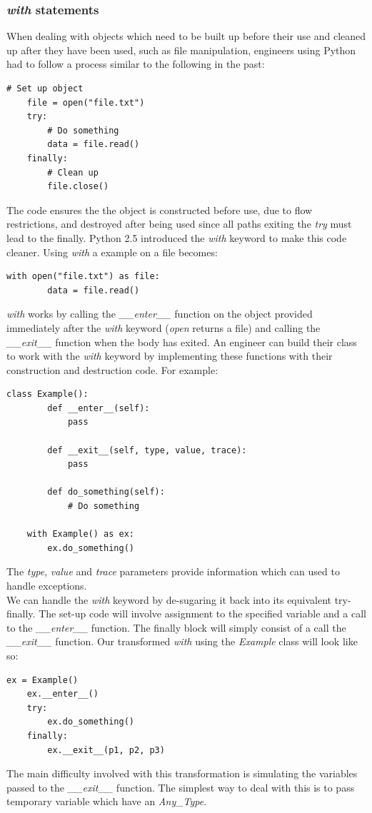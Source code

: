 \documentclass[12pt, titlepage]{article}
\begin{document}
\subsubsection{\textit{with} statements}
When dealing with objects which need to be built up before their use and cleaned up after they have been used, such as file manipulation, engineers using Python had to follow a process similar to the following in the past:
\begin{lstlisting}[mathescape]
	# Set up object
	file = open("file.txt")
	try:
		# Do something
		data = file.read()
	finally:
		# Clean up
		file.close()
\end{lstlisting}
The code ensures the the object is constructed before use, due to flow restrictions, and destroyed after being used since all paths exiting the \textit{try} must lead to the finally. Python 2.5 introduced the \textit{with} keyword to make this code cleaner. Using \textit{with} a example on a file becomes:
\begin{lstlisting}[mathescape]
	with open("file.txt") as file:
		data = file.read()
\end{lstlisting}
\textit{with} works by calling the \textit{\_\_enter\_\_} function on the object provided immediately after the \textit{with} keyword (\textit{open} returns a file) and calling the \textit{\_\_exit\_\_} function when the body has exited. An engineer can build their class to work with the \textit{with} keyword by implementing these functions with their construction and destruction code. For example:
\begin{lstlisting}[mathescape]
	class Example():
		def __enter__(self):
			pass
			
		def __exit__(self, type, value, trace):
			pass
			
		def do_something(self):
			# Do something
			
	with Example() as ex:
		ex.do_something()
\end{lstlisting}
The \textit{type}, \textit{value} and \textit{trace} parameters provide information which can used to handle exceptions. \\
We can handle the \textit{with} keyword by de-sugaring it back into its equivalent try-finally. The set-up code will involve assignment to the specified variable and a call to the \textit{\_\_enter\_\_} function. The finally block will simply consist of a call the \textit{\_\_exit\_\_} function. Our transformed \textit{with} using the \textit{Example} class will look like so:
\begin{lstlisting}[mathescape]
	ex = Example()
	ex.__enter__()
	try:
		ex.do_something()
	finally:
		ex.__exit__(p1, p2, p3)
\end{lstlisting}
The main difficulty involved with this transformation is simulating the variables passed to the \textit{\_\_exit\_\_} function. The simplest way to deal with this is to pass temporary variable which have an \textit{Any\_Type}.
\end{document}
